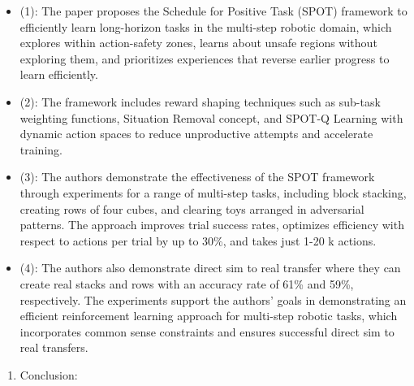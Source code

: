 \begin{itemize}
\item
  (1): The paper proposes the Schedule for Positive Task (SPOT)
  framework to efficiently learn long-horizon tasks in the multi-step
  robotic domain, which explores within action-safety zones, learns
  about unsafe regions without exploring them, and prioritizes
  experiences that reverse earlier progress to learn efficiently.
\item
  (2): The framework includes reward shaping techniques such as sub-task
  weighting functions, Situation Removal concept, and SPOT-Q Learning
  with dynamic action spaces to reduce unproductive attempts and
  accelerate training.
\item
  (3): The authors demonstrate the effectiveness of the SPOT framework
  through experiments for a range of multi-step tasks, including block
  stacking, creating rows of four cubes, and clearing toys arranged in
  adversarial patterns. The approach improves trial success rates,
  optimizes efficiency with respect to actions per trial by up to 30\%,
  and takes just 1-20 k actions.
\item
  (4): The authors also demonstrate direct sim to real transfer where
  they can create real stacks and rows with an accuracy rate of 61\% and
  59\%, respectively. The experiments support the authors' goals in
  demonstrating an efficient reinforcement learning approach for
  multi-step robotic tasks, which incorporates common sense constraints
  and ensures successful direct sim to real transfers.
\end{itemize}

\begin{enumerate}
\def\labelenumi{\arabic{enumi}.}
\setcounter{enumi}{7}
\tightlist
\item
  Conclusion:
\end{enumerate}

